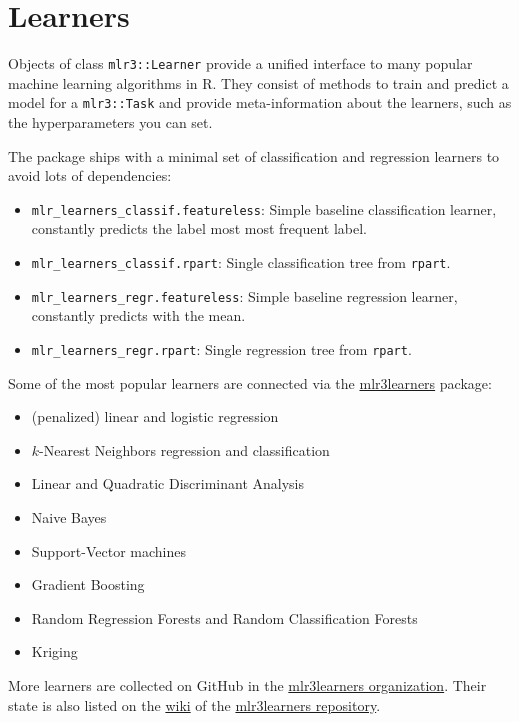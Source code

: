 \documentclass[
  11pt,
  parskip=half,
  DIV=calc,
  BCOR=10mm,
  x11names]{scrbook}
\providecommand{\tightlist}{%
  \setlength{\itemsep}{0pt}\setlength{\parskip}{0pt}}
\begin{document}
\hypertarget{learners}{%
\section{Learners}\label{learners}}

Objects of class \texttt{mlr3::Learner} provide a unified interface to many popular machine learning algorithms in R.
They consist of methods to train and predict a model for a \texttt{mlr3::Task} and provide meta-information about the learners, such as the hyperparameters you can set.

The package ships with a minimal set of classification and regression learners to avoid lots of dependencies:

\begin{itemize}
\tightlist
\item
  \texttt{mlr\_learners\_classif.featureless}: Simple baseline classification learner, constantly predicts the label most most frequent label.
\item
  \texttt{mlr\_learners\_classif.rpart}: Single classification tree from \texttt{rpart}.
\item
  \texttt{mlr\_learners\_regr.featureless}: Simple baseline regression learner, constantly predicts with the mean.
\item
  \texttt{mlr\_learners\_regr.rpart}: Single regression tree from \texttt{rpart}.
\end{itemize}

Some of the most popular learners are connected via the \href{https://mlr3learners.mlr-org.com}{mlr3learners} package:

\begin{itemize}
\tightlist
\item
  (penalized) linear and logistic regression
\item
  \(k\)-Nearest Neighbors regression and classification
\item
  Linear and Quadratic Discriminant Analysis
\item
  Naive Bayes
\item
  Support-Vector machines
\item
  Gradient Boosting
\item
  Random Regression Forests and Random Classification Forests
\item
  Kriging
\end{itemize}

More learners are collected on GitHub in the \href{https://github.com/mlr3learners/}{mlr3learners organization}.
Their state is also listed on the \href{https://github.com/mlr-org/mlr3learners/wiki}{wiki} of the \href{https://github.com/mlr-org/mlr3learners/}{mlr3learners repository}.
\end{document}
